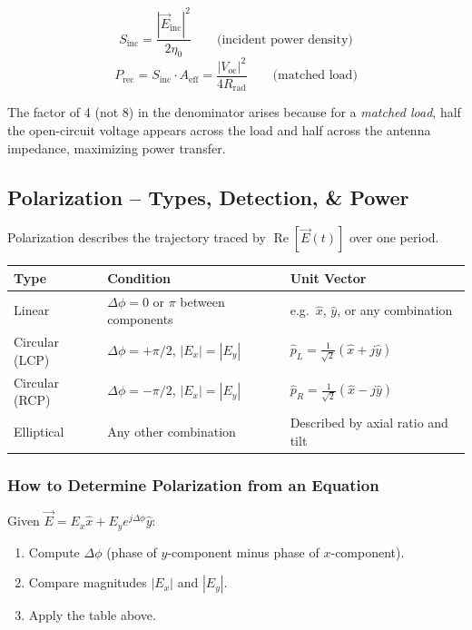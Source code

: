 \documentclass[10pt,letterpaper]{article}
\newcommand{\vE}{\vec{E}}
\newcommand{\xhat}{\hat{x}}
\newcommand{\yhat}{\hat{y}}
\newcommand{\Aeff}{A_{\mathrm{eff}}}
\newcommand{\Real}{\operatorname{Re}}
\begin{document}
\begin{equation}
  S_\mathrm{inc} = \frac{|\vE_\mathrm{inc}|^2}{2\eta_0} \qquad \text{(incident power density)}
\end{equation}
\begin{equation}
  \boxed{P_\mathrm{rec} = S_\mathrm{inc}\cdot\Aeff = \frac{|V_\mathrm{oc}|^2}{4R_\mathrm{rad}}} \qquad \text{(matched load)}
\end{equation}

The factor of 4 (not 8) in the denominator arises because for a \emph{matched load}, half the open-circuit voltage appears across the load and half across the antenna impedance, maximizing power transfer.

\subsection{Polarization -- Types, Detection, \& Power}

\begin{tcolorbox}[keybox, title={Polarization States}]
Polarization describes the trajectory traced by $\Real[\vE(t)]$ over one period.

\begin{tabular}{@{}p{2.5cm}p{5cm}p{5cm}@{}}
\toprule
\textbf{Type} & \textbf{Condition} & \textbf{Unit Vector} \\
\midrule
Linear & $\Delta\phi = 0$ or $\pi$ between components & e.g.\ $\hat{x}$, $\hat{y}$, or any combination \\
Circular (LCP) & $\Delta\phi = +\pi/2$, $|E_x|=|E_y|$ & $\hat{p}_L = \frac{1}{\sqrt{2}}(\xhat + j\yhat)$ \\
Circular (RCP) & $\Delta\phi = -\pi/2$, $|E_x|=|E_y|$ & $\hat{p}_R = \frac{1}{\sqrt{2}}(\xhat - j\yhat)$ \\
Elliptical & Any other combination & Described by axial ratio and tilt \\
\bottomrule
\end{tabular}
\end{tcolorbox}

\subsubsection{How to Determine Polarization from an Equation}
Given $\vE = E_x\xhat + E_ye^{j\Delta\phi}\yhat$:
\begin{enumerate}[noitemsep]
  \item Compute $\Delta\phi$ (phase of $y$-component minus phase of $x$-component).
  \item Compare magnitudes $|E_x|$ and $|E_y|$.
  \item Apply the table above.
\end{enumerate}
\end{document}
